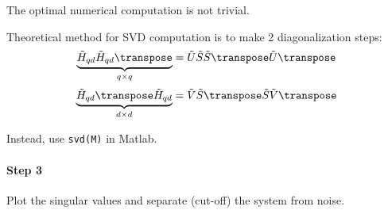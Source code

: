 \begin{rem}
    The optimal numerical computation is not trivial. 

    Theoretical method for SVD computation is to make 2 diagonalization steps:
    \[
        \underbrace{\tilde{H}_{qd} \tilde{H}_{qd}\transpose}_{q\times q} = \tilde{U}\tilde{S}\tilde{S}\transpose\tilde{U}\transpose
    \]
    \[
        \underbrace{\tilde{H}_{qd}\transpose \tilde{H}_{qd}}_{d\times d} = \tilde{V}\tilde{S}\transpose\tilde{S}\tilde{V}\transpose
    \]
    
    Instead, use \texttt{svd(M)} in Matlab.
\end{rem}

\paragraph{Step 3} Plot the singular values and separate (cut-off) the system from noise.

